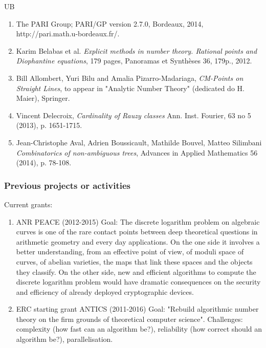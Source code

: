 \begin{sitedescription}{UB}
\begin{enumerate}
\item
The PARI Group; PARI/GP version 2.7.0, Bordeaux, 2014,
http://pari.math.u-bordeaux.fr/.

\item
Karim Belabas et al.
\textit{Explicit methods in number theory. Rational points and Diophantine equations},
179 pages, Panoramas et Synthèses 36, 179p., 2012.

\item
Bill Allombert, Yuri Bilu and Amalia Pizarro-Madariaga,
\textit{CM-Points on Straight Lines}, to appear in "Analytic Number Theory" (dedicated do H. Maier),
Springer.

\item
Vincent Delecroix,
\textit{Cardinality of Rauzy classes}
Ann. Inst. Fourier, 63 no 5 (2013), p. 1651-1715.

\item
Jean-Christophe Aval, Adrien Boussicault, Mathilde Bouvel, Matteo Silimbani
\textit{Combinatorics of non-ambiguous trees},
Advances in Applied Mathematics 56 (2014), p. 78-108.
\end{enumerate}

\subsubsection*{Previous projects or activities}

Current grants:
\begin{enumerate}
\item
 ANR PEACE (2012-2015)
    Goal: The discrete logarithm problem on algebraic curves is one of the rare
    contact points between deep theoretical questions in arithmetic geometry and
    every day applications. On the one side it involves a better understanding,
    from an effective point of view, of moduli space of curves, of abelian
    varieties, the maps that link these spaces and the objects they classify.
    On the other side, new and efficient algorithms to compute the discrete
    logarithm problem would have dramatic consequences on the security and
    efficiency of already deployed cryptographic devices. 

\item
ERC starting grant ANTICS (2011-2016) 
    Goal: "Rebuild algorithmic number theory on the firm grounds of theoretical
    computer science".
    Challenges: complexity (how fast can an algorithm be?), reliability
    (how correct should an algorithm be?), parallelisation.
\end{enumerate}


\end{sitedescription}
